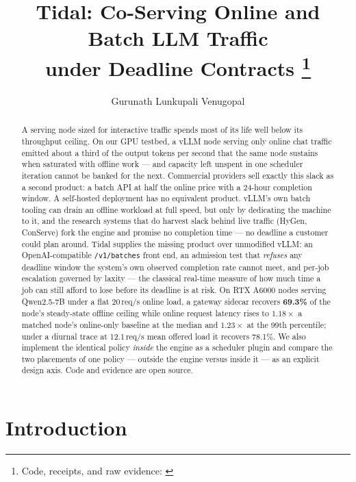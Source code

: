 \documentclass[11pt]{article}
\title{\bfseries Tidal: Co-Serving Online and Batch LLM Traffic\\ under Deadline Contracts%
\thanks{Code, receipts, and raw evidence:
\href{https://github.com/rajagurunath/tidal}{\code{github.com/rajagurunath/tidal}}}}
\author{Gurunath Lunkupali Venugopal}
\date{}
\newcommand{\code}[1]{\texttt{#1}}
\begin{document}
\maketitle

\begin{abstract}
\noindent
A serving node sized for interactive traffic spends most of its life well below its
throughput ceiling. On our GPU testbed, a vLLM node serving only online chat traffic
emitted about a third of the output tokens per second that the same node sustains when
saturated with offline work --- and capacity left unspent in one scheduler iteration
cannot be banked for the next. Commercial providers sell exactly this slack as a second
product: a batch API at half the online price with a 24-hour completion window. A
self-hosted deployment has no equivalent product. vLLM's own batch tooling can drain an
offline workload at full speed, but only by dedicating the machine to it, and the
research systems that do harvest slack behind live traffic (HyGen, ConServe) fork the
engine and promise no completion time --- no deadline a customer could plan around.
Tidal supplies the missing product over unmodified vLLM: an OpenAI-compatible
\code{/v1/batches} front end, an admission test that \emph{refuses} any deadline window
the system's own observed completion rate cannot meet, and per-job escalation governed
by laxity --- the classical real-time measure of how much time a job can still afford to
lose before its deadline is at risk. On RTX A6000 nodes serving Qwen2.5-7B under a flat
20\,req/s online load, a gateway sidecar recovers \textbf{69.3\%} of the node's
steady-state offline ceiling while online request latency rises to $1.18\times$ a
matched node's online-only baseline at the median and $1.23\times$ at the 99th
percentile; under a diurnal trace at 12.1\,req/s mean offered load it recovers 78.1\%.
We also implement the identical policy \emph{inside} the engine as a scheduler plugin
and compare the two placements of one policy --- outside the engine versus inside it ---
as an explicit design axis. Code and evidence are open source.
\end{abstract}

\section{Introduction}
\end{document}
